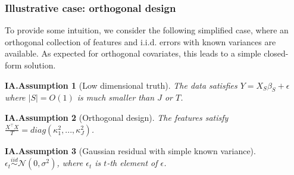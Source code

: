 \documentclass[11pt]{article}
\newcommand{\iid}{\stackrel{iid}{\sim}}
\newtheorem{Assumption}{IA.Assumption}
\begin{document}
	
	
	\subsubsection*{Illustrative case: orthogonal design}\label{sec:2.1}
	
	To provide some intuition, we consider the following simplified case, where an orthogonal collection of features and i.i.d. errors with known variances are available. As expected for orthogonal covariates, this leads to a simple closed-form solution.
	
	\begin{Assumption}[Low dimensional truth]\label{asu1}
		The data satisfies $Y=X_S\beta_S+\epsilon$ where $|S|=O(1)$ is much smaller than $J$ or $T$.
	\end{Assumption}
	\begin{Assumption}[Orthogonal design]\label{asu2}
		The features satisfy $\frac{X^\top X}{T}=diag(\kappa_1^2,...,\kappa_J^2)$.
	\end{Assumption}
	\begin{Assumption}[Gaussian residual with simple known variance]\label{asu3}
		$\epsilon_t\iid \mathcal{N}(0,\sigma^2)$, where $\epsilon_t$ is $t$-th element of $\epsilon$.
	\end{Assumption}
	
\end{document}
